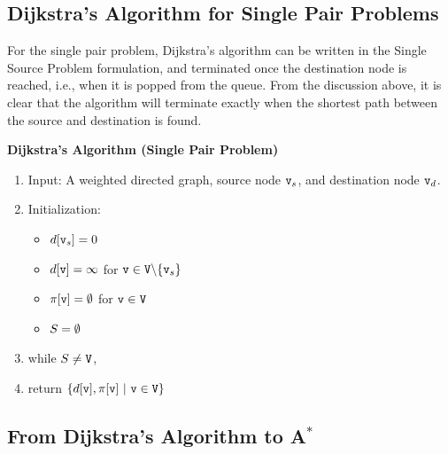 \subsection{Dijkstra's Algorithm for Single Pair Problems}

For the single pair problem, Dijkstra's algorithm can be written in the Single Source Problem formulation, and terminated once the destination node is reached, i.e., when it is popped from the queue. From the discussion above, it is clear that the algorithm will terminate exactly when the shortest path between the source and destination is found.

\begin{algorithm_}\textbf{Dijkstra's Algorithm (Single Pair Problem)}
\begin{enumerate}
\item{Input:} A weighted directed graph, source node ${\tt v}_s$, and destination node ${\tt v}_d$.

\item Initialization:
\begin{itemize}
  \item[] $d[{\tt v}_s] = 0$
  \item[] $d[{\tt v}] = \infty $ for ${\tt v} \in {\tt V}\backslash \{ {\tt v}_s\} $
  \item[] $\pi [{\tt v}] = \emptyset $ for ${\tt v} \in {\tt V}$
  \item[] ${S} = \emptyset $
\end{itemize}

\item while ${S} \ne {\tt V}$,





\item return $\{ d[\nodev],\policy [\nodev] \ |\ \nodev \in \nodes\} $
\end{enumerate}
\end{algorithm_}

\subsection{From Dijkstra's Algorithm to A$^*$}


